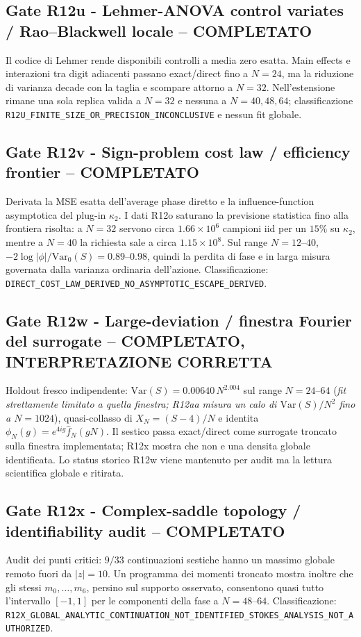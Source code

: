 \documentclass[11pt,a4paper]{article}
\begin{document}
\subsection*{Gate R12u - Lehmer-ANOVA control variates / Rao--Blackwell locale -- COMPLETATO}
Il codice di Lehmer rende disponibili controlli a media zero esatta. Main effects e interazioni tra digit adiacenti passano exact/direct fino a $N=24$, ma la riduzione di varianza decade con la taglia e scompare attorno a $N=32$. Nell'estensione rimane una sola replica valida a $N=32$ e nessuna a $N=40,48,64$; classificazione \texttt{R12U\_FINITE\_SIZE\_OR\_PRECISION\_INCONCLUSIVE} e nessun fit globale.

\subsection*{Gate R12v - Sign-problem cost law / efficiency frontier -- COMPLETATO}
Derivata la MSE esatta dell'average phase diretto e la influence-function asymptotica del plug-in $\kappa_2$. I dati R12o saturano la previsione statistica fino alla frontiera risolta: a $N=32$ servono circa $1.66\times10^6$ campioni iid per un $15\%$ su $\kappa_2$, mentre a $N=40$ la richiesta sale a circa $1.15\times10^8$. Sul range $N=12$--$40$, $-2\log|\phi|/\mathrm{Var}_0(S)=0.89$--$0.98$, quindi la perdita di fase e in larga misura governata dalla varianza ordinaria dell'azione. Classificazione: \texttt{DIRECT\_COST\_LAW\_DERIVED\_NO\_ASYMPTOTIC\_ESCAPE\_DERIVED}.

\subsection*{Gate R12w - Large-deviation / finestra Fourier del surrogate -- COMPLETATO, INTERPRETAZIONE CORRETTA}
Holdout fresco indipendente: $\mathrm{Var}(S)=0.00640\,N^{2.004}$ sul range $N=24$--$64$ (\emph{fit strettamente limitato a quella finestra; R12aa misura un calo di $\mathrm{Var}(S)/N^2$ fino a $N=1024$}), quasi-collasso di $X_N=(S-4)/N$ e identita $\phi_N(g)=e^{4ig}\widehat f_N(gN)$. Il sestico passa exact/direct come surrogate troncato sulla finestra implementata; R12x mostra che non e una densita globale identificata. Lo status storico R12w viene mantenuto per audit ma la lettura scientifica globale e ritirata.

\subsection*{Gate R12x - Complex-saddle topology / identifiability audit -- COMPLETATO}
Audit dei punti critici: $9/33$ continuazioni sestiche hanno un massimo globale remoto fuori da $|z|=10$. Un programma dei momenti troncato mostra inoltre che gli stessi $m_0,\ldots,m_6$, persino sul supporto osservato, consentono quasi tutto l'intervallo $[-1,1]$ per le componenti della fase a $N=48$--$64$. Classificazione: \nolinkurl{R12X_GLOBAL_ANALYTIC_CONTINUATION_NOT_IDENTIFIED_STOKES_ANALYSIS_NOT_AUTHORIZED}.
\end{document}
